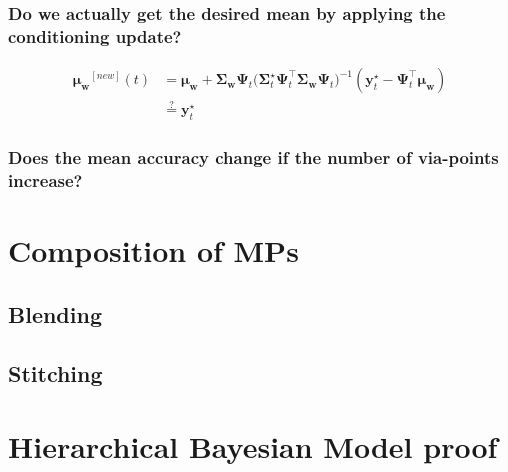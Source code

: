\documentclass{article}
\begin{document}
\subsubsection{Do we actually get the desired mean by applying the conditioning update?}
\begin{align}
  \bm{\mu_{w}}^{[new]}(t) &= \bm{\mu_w} + \bm{\Sigma_w}\bm{\Psi}_t \Big(\bm{\Sigma}_t^\star \bm{\Psi}_t^\top \bm{\Sigma_w}\bm{\Psi}_t \Big)^{-1} (\bm{y}_t^\star - \bm{\Psi}_t^\top \bm{\mu_w})\\
                          &\stackrel{?}{=} \bm{y}_t^\star
  \end{align}


\subsubsection{Does the mean accuracy change if the number of via-points increase?}

\section{Composition of MPs}
\subsection{Blending}
\subsection{Stitching}







\appendix
\section{Hierarchical Bayesian Model proof}
\end{document}
